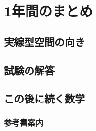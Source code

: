 \chapter{1年間のまとめ}


\section{実線型空間の向き}


\section{試験の解答}


\section{この後に続く数学}


\subsection{参考書案内}


